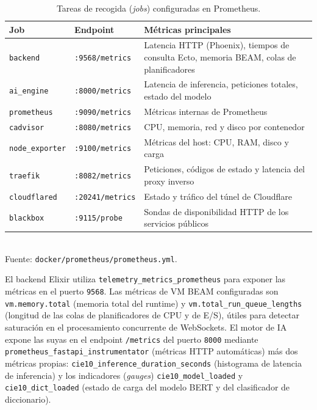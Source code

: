 \begin{table}[h]
\centering
\caption{Tareas de recogida (\emph{jobs}) configuradas en Prometheus.}
\label{tab:prometheus-jobs}
\begin{tabular}{llP{6.2cm}}
\hline
\textbf{Job} & \textbf{Endpoint} & \textbf{Métricas principales} \\
\hline
\texttt{backend} & \texttt{:9568/metrics} & Latencia HTTP (Phoenix), tiempos de consulta Ecto, memoria BEAM, colas de planificadores \\
\texttt{ai\_engine} & \texttt{:8000/metrics} & Latencia de inferencia, peticiones totales, estado del modelo \\
\texttt{prometheus} & \texttt{:9090/metrics} & Métricas internas de Prometheus \\
\texttt{cadvisor} & \texttt{:8080/metrics} & CPU, memoria, red y disco por contenedor \\
\texttt{node\_exporter} & \texttt{:9100/metrics} & Métricas del host: CPU, RAM, disco y carga \\
\texttt{traefik} & \texttt{:8082/metrics} & Peticiones, códigos de estado y latencia del proxy inverso \\
\texttt{cloudflared} & \texttt{:20241/metrics} & Estado y tráfico del túnel de Cloudflare \\
\texttt{blackbox} & \texttt{:9115/probe} & Sondas de disponibilidad HTTP de los servicios públicos \\
\hline
\end{tabular}
\\[4pt]
{\footnotesize Fuente: \texttt{docker/\allowbreak{}prometheus/\allowbreak{}prometheus.yml}.}
\end{table}

El backend Elixir utiliza \texttt{telemetry\_metrics\_prometheus} para exponer las métricas en el puerto \texttt{9568}. Las métricas de VM BEAM configuradas son \texttt{vm.memory.total} (memoria total del runtime) y \texttt{vm.total\_run\_queue\_lengths} (longitud de las colas de planificadores de CPU y de E/S), útiles para detectar saturación en el procesamiento concurrente de WebSockets. El motor de IA expone las suyas en el endpoint \texttt{/metrics} del puerto \texttt{8000} mediante \texttt{prometheus\_fastapi\_instrumentator} (métricas HTTP automáticas) más dos métricas propias: \texttt{cie10\_inference\_duration\_seconds} (histograma de latencia de inferencia) y los indicadores (\emph{gauges}) \texttt{cie10\_model\_loaded} y \texttt{cie10\_dict\_loaded} (estado de carga del modelo BERT y del clasificador de diccionario).

